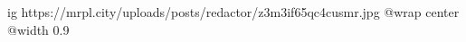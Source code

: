  
 
 
 
 

\ifcmt
  ig https://mrpl.city/uploads/posts/redactor/z3m3if65qc4cusmr.jpg
  @wrap center
  @width 0.9
\fi
